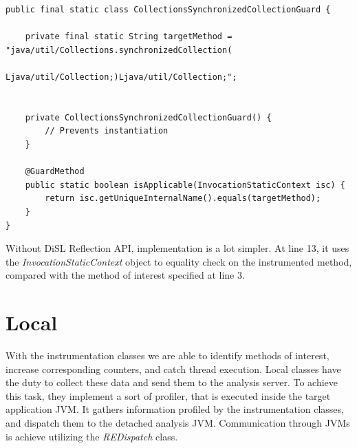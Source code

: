\documentclass[]{usiinfthesis}
\begin{document}
\vspace*{0.5cm}
\begin{verbatim}
public final static class CollectionsSynchronizedCollectionGuard {

    private final static String targetMethod = "java/util/Collections.synchronizedCollection(
                                             Ljava/util/Collection;)Ljava/util/Collection;";


    private CollectionsSynchronizedCollectionGuard() {
        // Prevents instantiation
    }

    @GuardMethod
    public static boolean isApplicable(InvocationStaticContext isc) {
        return isc.getUniqueInternalName().equals(targetMethod);
    }
}
\end{verbatim}
\vspace*{0.5cm}
Without DiSL Reflection API, implementation is a lot simpler. At line 13, it uses the \textit{InvocationStaticContext} object to equality check on the instrumented method, compared with the method of interest specified at line 3.


\section{Local} \label{sec:5.5}
With the instrumentation classes we are able to identify methods of interest, increase corresponding counters, and catch thread execution. Local classes have the duty to collect these data and send them to the analysis server. To achieve this task, they implement a sort of profiler, that is executed inside the target application JVM. It gathers information profiled by the instrumentation classes, and dispatch them to the detached analysis JVM. Communication through JVMs is achieve utilizing the \textit{REDispatch} class. 
\end{document}

